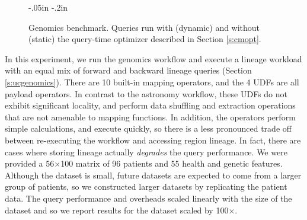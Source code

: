 \begin{figure}[t]
\vspace{-.1in}
\advance\leftskip-.05in
\advance\rightskip-.2in
\caption{Genomics benchmark.  Queries run
  with (dynamic) and without (static) the query-time optimizer
  described in Section \ref{s:cmopt}.}
\label{f:genomics1}
\end{figure}

In this experiment, we run the genomics workflow and execute a
lineage workload with an equal mix of forward and backward
lineage queries (Section \ref{s:ucgenomics}).  There are 10
built-in mapping operators, and the 4 UDFs are all payload operators.
In contrast to the astronomy workflow, these UDFs do not exhibit
significant locality, and perform data shuffling and extraction
operations that are not amenable to mapping functions.  In addition,
the operators perform simple calculations, and execute quickly, so
there is a less pronounced trade off between re-executing the workflow
and accessing region lineage.  In fact, there are cases where
storing lineage actually {\it degrades} the query performance.  We
were provided a 56$\times$100 matrix of 96 patients and 55 health and
genetic features.  Although the dataset is small, future datasets are
expected to come from a larger group of patients, so we constructed
larger datasets by replicating the patient data. The
query performance and overheads scaled linearly with the size of the
dataset and so we report results for the dataset scaled by 100$\times$.

